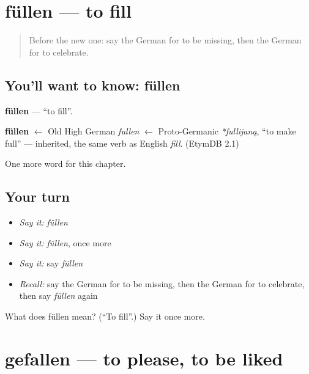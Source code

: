 \section[füllen]{füllen — to fill}

\label{lesson:GE-C146-fuellen}



\begin{quote}
Before the new one: say the German for to be missing, then the German for to celebrate.
\end{quote}

\subsection*{You'll want to know: füllen}
\textbf{füllen} — \textquotedblleft{}to fill\textquotedblright{}.

\begin{cousinweb}
\textbf{füllen} $\leftarrow$ Old High German \emph{fullen} $\leftarrow$ Proto-Germanic \emph{*fullijaną}, \textquotedblleft{}to make full\textquotedblright{} — inherited, the same verb as English \emph{fill}. (EtymDB 2.1)
\end{cousinweb}

\begin{grammarlens}[title={What you've built}]
One more word for this chapter.
\end{grammarlens}

\subsection*{Your turn}
\begin{itemize}
\raggedright
  \item \emph{Say it:} \emph{füllen}
  \item \emph{Say it:} \emph{füllen}, once more
  \item \emph{Say it:} say \emph{füllen}
  \item \emph{Recall:} say the German for to be missing, then the German for to celebrate, then say \emph{füllen} again
\end{itemize}

\begin{tcolorbox}[breakable,colback=teal!4,colframe=teal!35!black,title={Before you move on}]
What does füllen mean? (\textquotedblleft{}To fill\textquotedblright{}.) Say it once more.
\end{tcolorbox}
\section[gefallen]{gefallen — to please, to be liked}

